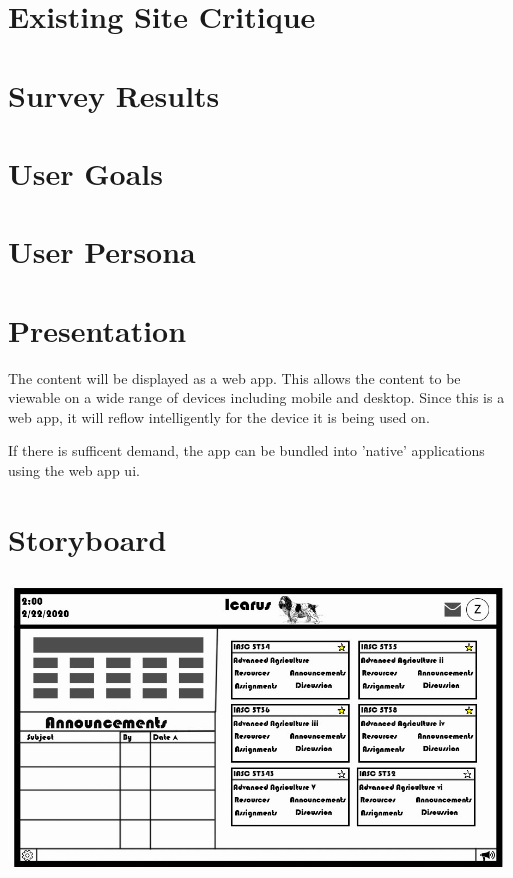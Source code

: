 \documentclass[12pt]{article}
\begin{document}
    \section{Existing Site Critique}\label{sec:existing-site-critique}



    \section{Survey Results}\label{sec:survey-results}



    \section{User Goals}\label{sec:user-goals}



    \section{User Persona}\label{sec:user-persona}



    \section{Presentation}\label{sec:presentation}

    The content will be displayed as a web app.
    This allows the content to be viewable on a wide range of devices including mobile and desktop.
    Since this is a web app, it will reflow intelligently for the device it is being used on.

    If there is sufficent demand, the app can be bundled into 'native' applications using the web app ui.


    \section{Storyboard}\label{sec:storyboard}

    \includegraphics[width=\textwidth]{StoryBoard.jpg}
\end{document}
